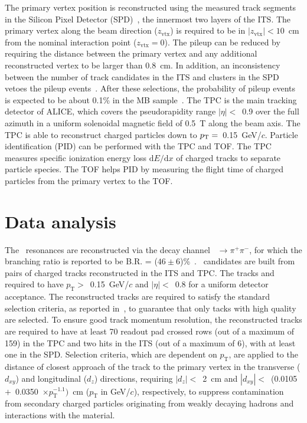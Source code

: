 The primary vertex position is reconstructed using the measured track segments in the Silicon Pixel Detector (SPD)~\cite{Santoro2009:ALICESPD}, the innermost two layers of the ITS. The primary vertex along the beam direction ($z_\mathrm{vtx}$) is required to be in $|z_\mathrm{vtx}|<10$~cm from the nominal interaction point ($z_\mathrm{vtx}=0$). The pileup can be reduced by requiring the distance between the primary vertex and any additional reconstructed vertex to be larger than 0.8~cm. In addition, an inconsistency between the number of track candidates in the ITS and clusters in the SPD vetoes the pileup events~\cite{ALICE:2015olq}. After these selections, the probability of pileup events is expected to be about 0.1\% in the MB sample~\cite{ALICE:2017svf}. The TPC is the main tracking detector of ALICE, which covers the pseudorapidity range $|\eta|<$~0.9 over the full azimuth in a uniform solenoidal magnetic field of 0.5~T along the beam axis. The TPC is able to reconstruct charged particles down to $p_{\rm{T}}=$~0.15~GeV/$c$. Particle identification (PID) can be performed with the TPC and TOF. The TPC measures specific ionization energy loss $\mathrm{d}E/\mathrm{d}x$ of charged tracks to separate particle species. The TOF helps PID by measuring the flight time of charged particles from the primary vertex to the TOF.

\section{Data analysis}

The \fzero~resonances are reconstructed via the decay channel \fzero~$\rightarrow \pi^{+}\pi^{-}$, for which the branching ratio is reported to be B.R. = ($46\pm6$)\%~\cite{Stone:2013eaa}. \fzero~candidates are built from pairs of charged tracks reconstructed in the ITS and TPC. The tracks and required to have $p_{\mathrm{T}}>$~0.15~GeV/$c$ and $|\eta|<$~0.8 for a uniform detector acceptance. The reconstructed tracks are required to satisfy the standard selection criteria, as reported in~\cite{ALICE:2022qnb}, to guarantee that only tacks with high quality are selected. To ensure good track momentum resolution, the reconstructed tracks are required to have at least 70 readout pad crossed rows (out of a maximum of 159) in the TPC and two hits in the ITS (out of a maximum of 6), with at least one in the SPD. Selection criteria, which are dependent on $p_{\mathrm{T}}$, are applied to the distance of closest approach of the track to the primary vertex in the transverse ($d_{xy}$) and longitudinal ($d_{z}$) directions, requiring $|d_{z}|<$~2~cm and $|d_{xy}|<$~(0.0105~$+$~0.0350~$\times p_{\mathrm{T}}^{-1.1})$~cm ($p_{\mathrm{T}}$ in GeV/$c$), respectively, to suppress contamination from secondary charged particles originating from weakly decaying hadrons and interactions with the material.

